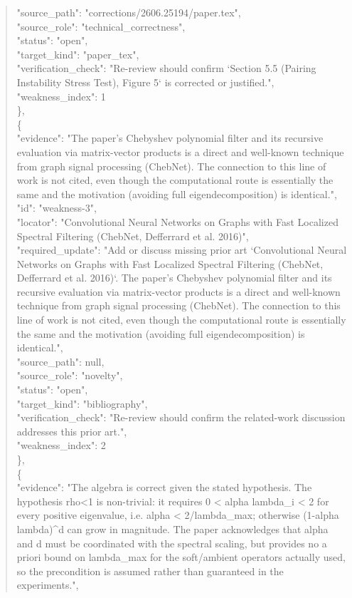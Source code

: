 \documentclass[11pt]{article}
\begin{document}
\begin{quote}
      "source\_path": "corrections/2606.25194/paper.tex",\\
      "source\_role": "technical\_correctness",\\
      "status": "open",\\
      "target\_kind": "paper\_tex",\\
      "verification\_check": "Re-review should confirm `Section 5.5 (Pairing Instability Stress Test), Figure 5` is corrected or justified.",\\
      "weakness\_index": 1\\
    \},\\
    \{\\
      "evidence": "The paper's Chebyshev polynomial filter and its recursive evaluation via matrix-vector products is a direct and well-known technique from graph signal processing (ChebNet). The connection to this line of work is not cited, even though the computational route is essentially the same and the motivation (avoiding full eigendecomposition) is identical.",\\
      "id": "weakness-3",\\
      "locator": "Convolutional Neural Networks on Graphs with Fast Localized Spectral Filtering (ChebNet, Defferrard et al. 2016)",\\
      "required\_update": "Add or discuss missing prior art `Convolutional Neural Networks on Graphs with Fast Localized Spectral Filtering (ChebNet, Defferrard et al. 2016)`. The paper's Chebyshev polynomial filter and its recursive evaluation via matrix-vector products is a direct and well-known technique from graph signal processing (ChebNet). The connection to this line of work is not cited, even though the computational route is essentially the same and the motivation (avoiding full eigendecomposition) is identical.",\\
      "source\_path": null,\\
      "source\_role": "novelty",\\
      "status": "open",\\
      "target\_kind": "bibliography",\\
      "verification\_check": "Re-review should confirm the related-work discussion addresses this prior art.",\\
      "weakness\_index": 2\\
    \},\\
    \{\\
      "evidence": "The algebra is correct given the stated hypothesis. The hypothesis rho<1 is non-trivial: it requires 0 < alpha lambda\_i < 2 for every positive eigenvalue, i.e. alpha < 2/lambda\_max; otherwise (1-alpha lambda)\^{}d can grow in magnitude. The paper acknowledges that alpha and d must be coordinated with the spectral scaling, but provides no a priori bound on lambda\_max for the soft/ambient operators actually used, so the precondition is assumed rather than guaranteed in the experiments.",\\

\end{quote}
\end{document}
